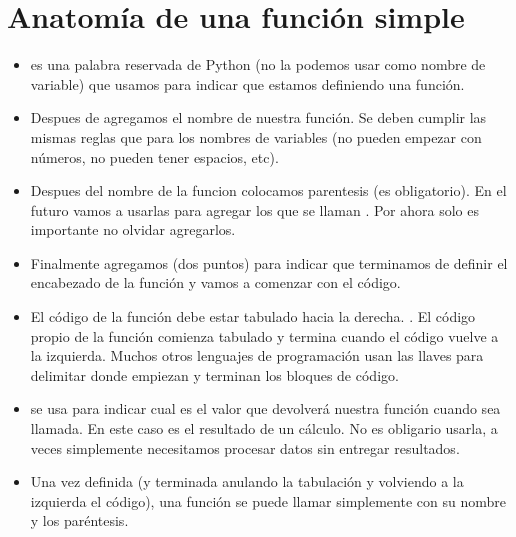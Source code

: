 \documentclass[a4paper,12pt,spanish]{sphinxmanual}
\begin{document}
\section{Anatomía de una función simple}
\label{\detokenize{fn:anatomia-de-una-funcion-simple}}\begin{itemize}
\item {} 
\sphinxAtStartPar
{} es una palabra reservada de Python (no la podemos usar como nombre de variable)
que usamos para indicar que estamos definiendo una función.

\item {} 
\sphinxAtStartPar
Despues de  agregamos el nombre de nuestra función. Se deben cumplir las mismas
reglas que para los nombres de variables (no pueden empezar con números, no pueden tener
espacios, etc).

\item {} 
\sphinxAtStartPar
Despues del nombre de la funcion colocamos parentesis (es obligatorio). En el futuro
vamos a usarlas para agregar los que se llaman . Por ahora solo es importante
no olvidar agregarlos.

\item {} 
\sphinxAtStartPar
Finalmente agregamos \sphinxstyleemphasis{:} (dos puntos) para indicar que terminamos de definir el encabezado
de la función y vamos a comenzar con el código.

\item {} 
\sphinxAtStartPar
El código de la función debe estar tabulado hacia la derecha. . El código propio de
la función comienza tabulado y termina cuando el código vuelve a la izquierda. Muchos otros
lenguajes de programación usan las llaves \sphinxcode{\sphinxupquote{\{\}}} para delimitar donde empiezan y terminan
los bloques de código.

\item {} 
\sphinxAtStartPar
{} se usa para indicar cual es el valor que devolverá nuestra función cuando sea
llamada. En este caso es el resultado de un cálculo. No es obligario usarla, a veces simplemente
necesitamos procesar datos sin entregar resultados.

\item {} 
\sphinxAtStartPar
Una vez definida (y terminada anulando la tabulación y volviendo a la izquierda el código),
una función se puede llamar simplemente con su nombre y los paréntesis.

\end{itemize}
\end{document}
